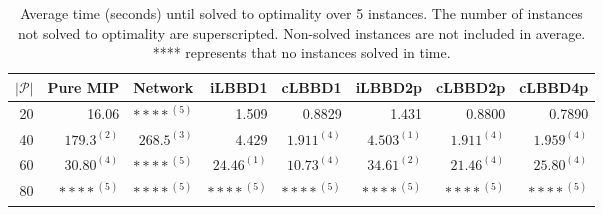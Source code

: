 \begin{table*}
    \centering
    \caption{Average time (seconds) until solved to optimality over 5 instances. The number of instances not solved to optimality are superscripted. Non-solved instances are not included in average. **** represents that no instances solved in time.}
    \begin{tabular}{rrrrrrrr} \toprule
        $|\mathcal{P}|$ & Pure MIP & Network & iLBBD1 & cLBBD1 & iLBBD2p & cLBBD2p & cLBBD4p \\ \midrule
        20              & 16.06 &     ${****}^{(5)}$    & 1.509 &  0.8829 & 1.431 & 0.8800 & 0.7890 \\
        40              & $179.3^{(2)}$ & $268.5^{(3)}$   &  $4.429$ & $1.911^{(4)}$ & $4.503^{(1)}$ & $1.911^{(4)}$ & $1.959^{(4)}$ \\
        60 & $30.80^{(4)}$ & ${****}^{(5)}$ & $24.46^{(1)}$ & $10.73^{(4)}$ & $34.61^{(2)}$ & $21.46^{(4)}$ & $25.80^{(4)}$ \\
        80 & ${****}^{(5)}$ & ${****}^{(5)}$ & ${****}^{(5)}$ & ${****}^{(5)}$ & ${****}^{(5)}$ & ${****}^{(5)}$ & ${****}^{(5)}$ \\
        \bottomrule
    \end{tabular}
\end{table*}

